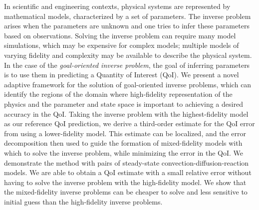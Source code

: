 In scientific and engineering contexts, physical systems are represented by mathematical models, characterized by a set of parameters. The inverse problem arises when the parameters are unknown and one tries to infer these parameters based on observations. Solving the inverse problem can require many model simulations, which may be expensive for complex models; multiple models of varying fidelity and complexity may be available to describe the physical system. In the case of the \textit{goal-oriented inverse problem}, the goal of inferring parameters is to use them in predicting a Quantity of Interest (QoI). We present a novel adaptive framework for the solution of goal-oriented inverse problems, which can identify the regions of the domain where high-fidelity representation of the physics and the parameter and state space is important to achieving a desired accuracy in the QoI. Taking the inverse problem with the highest-fidelity model as our reference QoI prediction, we derive a third-order estimate for the QoI error from using a lower-fidelity model. This estimate can be localized, and the error decomposition then used to guide the formation of mixed-fidelity models with which to solve the inverse problem, while minimizing the error in the QoI. We demonstrate the method with pairs of steady-state convection-diffusion-reaction models. We are able to obtain a QoI estimate with a small relative error without having to solve the inverse problem with the high-fidelity model. We show that the mixed-fidelity inverse problems can be cheaper to solve and less sensitive to initial guess than the high-fidelity inverse problems.

